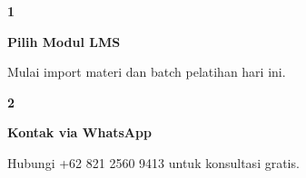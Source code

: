 \documentclass[a4paper]{article}
\begin{document}
\begin{center}
\begin{minipage}[t]{0.318\textwidth}
    \colorbox{BlueBg}{%
        \begin{minipage}{\dimexpr\linewidth-2\fboxsep\relax}
            \vspace{6pt}
            \begin{center}
                {\fontsize{22}{26}\selectfont\bfseries\color{BluePrimary} 1}
            \end{center}
            \vspace{2pt}
            \begin{center}
                {\fontsize{10}{13}\selectfont\bfseries\color{BlueDark} Pilih Modul LMS}\par\vspace{3pt}
                {\fontsize{9}{12}\selectfont\color{TextDark} Mulai import materi dan batch pelatihan hari ini.}
            \end{center}
            \vspace{6pt}
        \end{minipage}}
\end{minipage}%
\hfill
\begin{minipage}[t]{0.318\textwidth}
    \colorbox{BlueBg}{%
        \begin{minipage}{\dimexpr\linewidth-2\fboxsep\relax}
            \vspace{6pt}
            \begin{center}
                {\fontsize{22}{26}\selectfont\bfseries\color{BluePrimary} 2}
            \end{center}
            \vspace{2pt}
            \begin{center}
                {\fontsize{10}{13}\selectfont\bfseries\color{BlueDark} Kontak via WhatsApp}\par\vspace{3pt}
                {\fontsize{9}{12}\selectfont\color{TextDark} Hubungi +62 821 2560 9413 untuk konsultasi gratis.}
            \end{center}
            \vspace{6pt}
        \end{minipage}}
\end{minipage}%
\hfill
\begin{minipage}[t]{0.318\textwidth}
    \colorbox{BlueBg}{%
        \begin{minipage}{\dimexpr\linewidth-2\fboxsep\relax}
            \vspace{6pt}

\end{minipage}}
\end{minipage}
\end{center}
\end{document}
